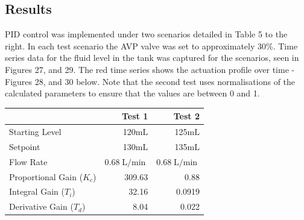 \documentclass{article}
\begin{document}
\subsection{Results}
\begin{minipage}{0.45\textwidth}
	PID control was implemented under two scenarios detailed in Table 5 to the right. In each test scenario the AVP valve was set to approximately 30\%. Time series data for the fluid level in the tank was captured for the scenarios, seen in Figures 27, and 29. The red time series shows the actuation profile over time - Figures 28, and 30 below. Note that the second test uses normalisations of the calculated parameters to ensure that the values are between 0 and 1.
\end{minipage}
\hspace{0.5cm}
\begin{minipage}{0.45\textwidth}
	\small
	\begin{tabular}{lrr}
		\toprule
		& Test 1 & Test 2 \\
		\midrule
		Starting Level & 120$\si{\milli\liter}$ & 125$\si{\milli\liter}$ \\
		Setpoint & 130$\si{\milli\liter}$ & 135$\si{\milli\liter}$ \\
		Flow Rate & 0.68$\si{\liter\per\min}$ & 0.68$\si{\liter\per\min}$ \\
		Proportional Gain ($K_c$) & 309.63 & 0.88 \\
		Integral Gain ($T_i$) & 32.16 & 0.0919 \\
		Derivative Gain ($T_d$) & 8.04 & 0.022 \\
		\bottomrule
	\end{tabular}
\end{minipage}
\end{document}
